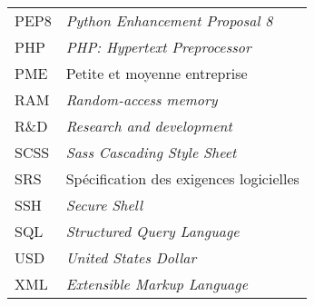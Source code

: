 \begin{longtable}{lp{5in}}
PEP8      & \textit{Python Enhancement Proposal 8}\\
PHP       & \textit{PHP: Hypertext Preprocessor}\\
PME       & Petite et moyenne entreprise\\
RAM       & \textit{Random-access memory}\\
R\&D      & \textit{Research and development}\\
SCSS      & \textit{Sass Cascading Style Sheet}\\
SRS       & Spécification des exigences logicielles\\
SSH       & \textit{Secure Shell}\\
SQL       & \textit{Structured Query Language}\\
USD       & \textit{United States Dollar}\\
XML       & \textit{Extensible Markup Language}\\

\end{longtable}
